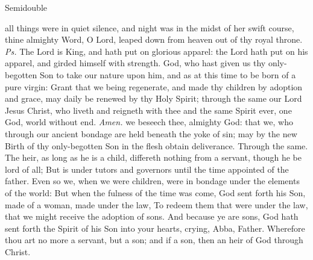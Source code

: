 \begin{inhead}
{Semidouble}
\end{inhead}
\par\noindent
{}

\introit
{} all things were in quiet silence, and night was in the midst of her swift course, thine almighty Word, O Lord, leaped down from heaven out of thy royal throne. \textit{Ps.} The Lord is King, and hath put on glorious apparel: the Lord hath put on his apparel, and girded himself with strength.
\collect
{} God, who hast given us thy only-begotten Son to take our nature upon him, and as at this time to be born of a pure virgin: Grant that we being regenerate, and made thy children by adoption and grace, may daily be renewed by thy Holy Spirit; through the same our Lord Jesus Christ, who liveth and reigneth with thee and the same Spirit ever, one God, world without end. \textit{Amen.}
 we beseech thee, almighty God: that we, who through our ancient bondage are held beneath the yoke of sin; may by the new Birth of thy only-begotten Son in the flesh obtain deliverance. Through the same.
 The heir, as long as he is a child, differeth nothing from a servant, though he be lord of all; But is under tutors and governors until the time appointed of the father. Even so we, when we were children, were in bondage under the elements of the world: But when the fulness of the time was come, God sent forth his Son, made of a woman, made under the law, To redeem them that were under the law, that we might receive the adoption of sons. And because ye are sons, God hath sent forth the Spirit of his Son into your hearts, crying, Abba, Father. Wherefore thou art no more a servant, but a son; and if a son, then an heir of God through Christ.

